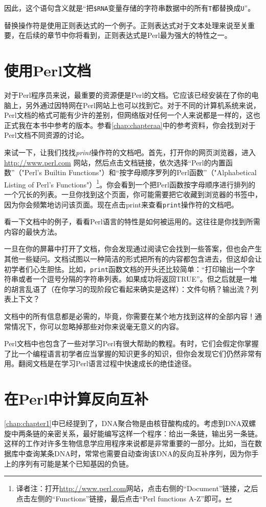 因此，这个语句含义就是“把\verb|$RNA|变量存储的字符串数据中的所有\verb|T|都替换成\verb|U|”。

替换操作符是使用正则表达式的一个例子。正则表达式对于文本处理来说至关重要，在后续的章节中你将看到，正则表达式是Perl最为强大的特性之一。

\section{使用Perl文档}
对于Perl程序员来说，最重要的资源便是Perl的文档。它应该已经安装在了你的电脑上，另外通过因特网在Perl网站上也可以找到它。对于不同的计算机系统来说，Perl文档的格式可能有少许的差别，但网络版对任何一个人来说都是一样的，这也正式我在本书中参考的版本。参看\autoref{chap:chapteraa}中的参考资料，你会找到对于Perl文档不同资源的讨论。

来试一下，让我们找找\textit{print}操作符的文档吧。首先，打开你的网页浏览器，进入 \href{http://www.perl.com}{http://www.perl.com} 网站，然后点击文档链接，依次选择“Perl的内置函数”（"Perl's Builtin Functions"）和“按字母顺序罗列的Perl函数”（"Alphabetical Listing of Perl's Functions"）\footnote{译者注：打开\href{http://www.perl.com}{http://www.perl.com}网站，点击右侧的“Document”链接，之后点击左侧的“Functions”链接，最后点击“Perl functions A-Z”即可。}。你会看到一个把Perl函数按字母顺序进行排列的一个冗长的列表。一旦你找到这个页面，你可能需要把它收藏到浏览器的书签中，因为你会频繁地访问该页面。现在点击print来查看\verb|print|操作符的文档吧。

看一下文档中的例子，看看Perl语言的特性是如何被运用的。这往往是你找到所需内容的最快方法。

一旦在你的屏幕中打开了文档，你会发现通过阅读它会找到一些答案，但也会产生其他一些疑问。文档试图以一种简洁的形式把所有的内容都包含进去，但这却会让初学者们心生胆怯。比如，\verb|print|函数文档的开头还比较简单：“打印输出一个字符串或者一个逗号分隔的字符串列表。如果成功将返回TRUE”。但之后就是一堆的胡言乱语了（在你学习的现阶段它看起来确实是这样）：文件句柄？输出流？列表上下文？

文档中的所有信息都是必需的，毕竟，你需要在某个地方找到这样的全部内容！通常情况下，你可以忽略掉那些对你来说毫无意义的内容。

Perl文档中也包含了一些对学习Perl有很大帮助的教程。有时，它们会假定你掌握了比一个编程语言初学者应当掌握的知识更多的知识，但你会发现它们仍然非常有用。翻阅文档是在学习Perl语言过程中快速成长的绝佳途径。

\section{在Perl中计算反向互补}
\autoref{chap:chapter1}中已经提到了，DNA聚合物是由核苷酸构成的。考虑到DNA双螺旋中两条链的亲密关系，最好能编写这样一个程序：给出一条链，输出另一条链。这样的工作对许多生物信息学应用程序来说都是非常重要的一部分。比如，当在数据库中查询某条DNA时，常常也需要自动查询该DNA的反向互补序列，因为你手上的序列有可能是某个已知基因的负链。

